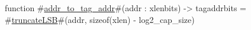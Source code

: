 function #\hyperref[sailRISCVzaddrzytozytagzyaddr]{addr\_to\_tag\_addr}#(addr : xlenbits) -> tagaddrbits = #\hyperref[sailRISCVztruncateLSB]{truncateLSB}#(addr, sizeof(xlen) - log2_cap_size)
